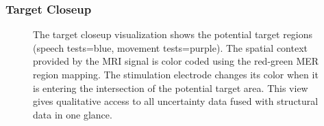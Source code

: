 \documentclass{vgtc}                          %
\begin{document}

\subsubsection{Target Closeup}\label{sec:overview:placement:targetareaview}
\begin{figure}[t]
  \centering
  \caption{The target closeup visualization shows the potential target regions (speech tests=blue, movement tests=purple). The spatial context provided by the MRI signal is color coded using the red-green MER region mapping. The stimulation electrode changes its color when it is entering the intersection of the potential target area. This view gives qualitative access to all uncertainty data fused with structural data in one glance.}
  \label{fig:targetregion}
\end{figure}
\end{document}
